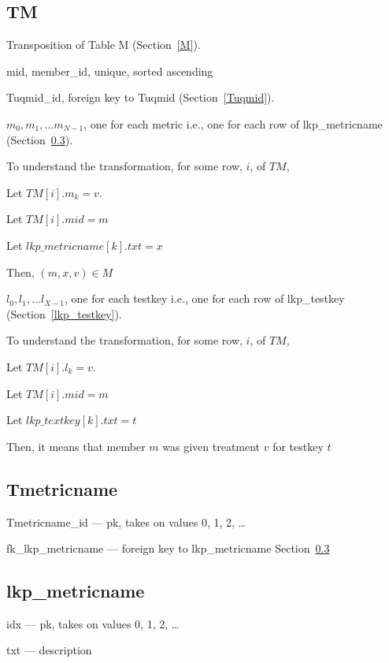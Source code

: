 \subsection{TM}
\label{TM}
Transposition of Table M (Section~\ref{M}).
\be
\item mid, member\_id, unique, sorted ascending
\item Tuqmid\_id, foreign key to Tuqmid (Section~\ref{Tuqmid}).
\item \(m_0, m_1, \ldots m_{N-1}\), one for each metric i.e., one for
each row of lkp\_metricname (Section~\ref{lkp_metricname}).

To understand the transformation, for some row, \(i\), of \(TM\),
\bi
\item Let \(TM[i].m_k = v\). 
\item Let \(TM[i].mid  = m\)
\item Let \(lkp\_metricname[k].txt = x\)
\item Then, \((m, x, v) \in M\)
\ei

\item \(l_0, l_1, \ldots l_{X-1}\), one for each testkey i.e., one for
each row of lkp\_testkey (Section~\ref{lkp_testkey}).

To understand the transformation, for some row, \(i\), of \(TM\),
\bi
\item Let \(TM[i].l_k = v\). 
\item Let \(TM[i].mid  = m\)
\item Let \(lkp\_textkey[k].txt = t\)
\item Then, it means that member \(m\) was given treatment \(v\) for
testkey \(t\)
\ei
\ee


\subsection{Tmetricname}
\label{Tmetricname}
\be
\item Tmetricname\_id --- pk, takes on values 0, 1, 2, \ldots
\item fk\_lkp\_metricname --- foreign key to lkp\_metricname
Section~\ref{lkp_metricname}
\ee

\subsection{lkp\_metricname}
\label{lkp_metricname}
\be
\item idx --- pk, takes on values 0, 1, 2, \ldots
\item txt --- description
\ee
